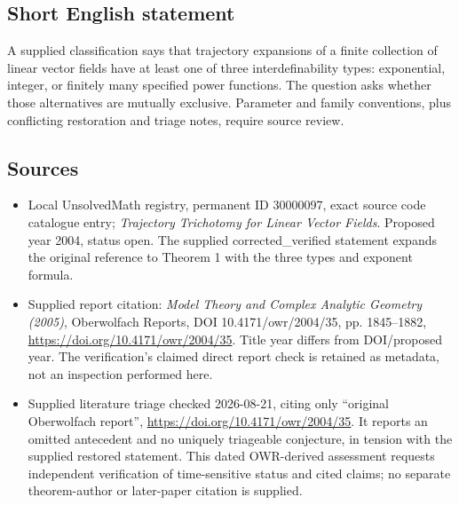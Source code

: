 \documentclass[11pt]{article}
\begin{document}
\subsection{Short English statement}
A supplied classification says that trajectory expansions of a finite collection of linear vector fields have at least one of three interdefinability types: exponential, integer, or finitely many specified power functions. The question asks whether those alternatives are mutually exclusive. Parameter and family conventions, plus conflicting restoration and triage notes, require source review.
\subsection{Sources}
\begin{itemize}
\item Local UnsolvedMath registry, permanent ID 30000097, exact source code catalogue entry; \emph{Trajectory Trichotomy for Linear Vector Fields}. Proposed year 2004, status open. The supplied corrected\_verified statement expands the original reference to Theorem 1 with the three types and exponent formula.
\item Supplied report citation: \emph{Model Theory and Complex Analytic Geometry (2005)}, Oberwolfach Reports, DOI 10.4171/owr/2004/35, pp. 1845--1882, \url{https://doi.org/10.4171/owr/2004/35}. Title year differs from DOI/proposed year. The verification's claimed direct report check is retained as metadata, not an inspection performed here.
\item Supplied literature triage checked 2026-08-21, citing only ``original Oberwolfach report'', \url{https://doi.org/10.4171/owr/2004/35}. It reports an omitted antecedent and no uniquely triageable conjecture, in tension with the supplied restored statement. This dated OWR-derived assessment requests independent verification of time-sensitive status and cited claims; no separate theorem-author or later-paper citation is supplied.
\end{itemize}
\end{document}
